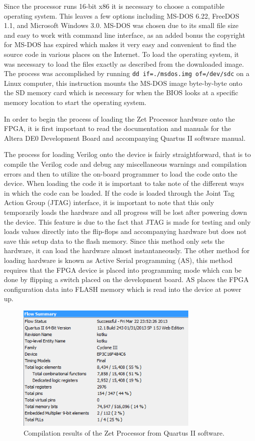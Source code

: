 \documentclass[pdftex,10.5pt]{report}
\begin{document}
Since the processor runs 16-bit x86 it is necessary to choose a compatible operating system. This leaves a few options including MS-DOS 6.22, FreeDOS 1.1, and Microsoft Windows 3.0. MS-DOS was chosen due to its small file size and easy to work with command line interface, as an added bonus the copyright for MS-DOS has expired which makes it very easy and convenient to find the source code in various places on the Internet. To load the operating system, it was necessary to load the files exactly as described from the downloaded image. The process was accomplished by running {\tt dd if=./msdos.img of=/dev/sdc} on a Linux computer, this instruction mounts the MS-DOS image byte-by-byte onto the SD memory card which is necessary for when the BIOS looks at a specific memory location to start the operating system.

In order to begin the process of loading the Zet Processor hardware onto the FPGA, it is first important to read the documentation and manuals for the Altera DE0 Development Board and accompanying Quartus II software manual. 

The process for loading Verilog onto the device is fairly straightforward, that is to compile the Verilog code and debug any miscellaneous warnings and compilation errors and then to utilize the on-board programmer to load the code onto the device. When loading the code it is important to take note of the different ways in which the code can be loaded. If the code is loaded through the Joint Tag Action Group (JTAG) interface, it is important to note that this only temporarily loads the hardware and all progress will be lost after powering down the device. This feature is due to the fact that JTAG is made for testing and only loads values directly into the flip-flops and accompanying hardware but does not save this setup data to the flash memory. Since this method only sets the hardware, it can load the hardware almost instantaneously. The other method for loading hardware is known as Active Serial programming (AS), this method requires that the FPGA device is placed into programming mode which can be done by flipping a switch placed on the development board. AS places the FPGA configuration data into FLASH memory which is read into the device at power up.

\begin{figure}[!h]
	\centering
	\includegraphics[width=3.5in]{figures/CompileResults.png}
	\caption{Compilation results of the Zet Processor from Quartus II software.}
	\label{fig:CompileResults}
\end{figure}
\end{document}
